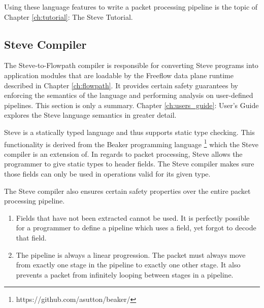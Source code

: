 Using these language features to write a packet processing pipeline is the topic of Chapter \ref{ch:tutorial}: The Steve Tutorial.

\subsection{Steve Compiler}

The Steve-to-Flowpath compiler is responsible for converting Steve programs into application modules that are loadable by the Freeflow data plane runtime \cite{freeflow_software} described in Chapter \ref{ch:flowpath}. It provides certain safety guarantees by enforcing the semantics of the language and performing analysis on user-defined pipelines. This section is only a summary. Chapter \ref{ch:users_guide}: User's Guide explores the Steve language semantics in greater detail.

Steve is a statically typed language and thus supports static type checking. This functionality is derived from the Beaker programming language \footnote{https://github.com/asutton/beaker/} which the Steve compiler is an extension of. In regards to packet processing, Steve allows the programmer to give static types to header fields. The Steve compiler makes sure those fields can only be used in operations valid for its given type. 

The Steve compiler also ensures certain safety properties over the entire packet processing pipeline.

\begin{enumerate}
\item Fields that have not been extracted cannot be used. It is perfectly possible for a programmer to define a pipeline which uses a field, yet forgot to decode that field.

\item The pipeline is always a linear progression. The packet must always move from exactly one stage in the pipeline to exactly one other stage. It also prevents a packet from infinitely looping between stages in a pipeline.
\end{enumerate}